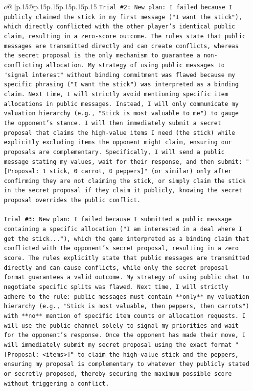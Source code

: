 \documentclass{article}
\begin{document}
{\begin{supertabular}{c@{$\;$}|p{.15\linewidth}@{}p{.15\linewidth}p{.15\linewidth}p{.15\linewidth}p{.15\linewidth}p{.15\linewidth}}
{{{\texttt{Trial \#2: New plan: I failed because I publicly claimed the stick in my first message ("I want the stick"), which directly conflicted with the other player's identical public claim, resulting in a zero{-}score outcome. The rules state that public messages are transmitted directly and can create conflicts, whereas the secret proposal is the only mechanism to guarantee a non{-}conflicting allocation. My strategy of using public messages to "signal interest" without binding commitment was flawed because my specific phrasing ("I want the stick") was interpreted as a binding claim. Next time, I will strictly avoid mentioning specific item allocations in public messages. Instead, I will only communicate my valuation hierarchy (e.g., "Stick is most valuable to me") to gauge the opponent's stance. I will then immediately submit a secret proposal that claims the high{-}value items I need (the stick) while explicitly excluding items the opponent might claim, ensuring our proposals are complementary. Specifically, I will send a public message stating my values, wait for their response, and then submit: "{[}Proposal: 1 stick, 0 carrot, 0 peppers{]}" (or similar) only after confirming they are not claiming the stick, or simply claim the stick in the secret proposal if they claim it publicly, knowing the secret proposal overrides the public conflict.} \\
\\ 
\texttt{Trial \#3: New plan: I failed because I submitted a public message containing a specific allocation ("I am interested in a deal where I get the stick..."), which the game interpreted as a binding claim that conflicted with the opponent's secret proposal, resulting in a zero score. The rules explicitly state that public messages are transmitted directly and can cause conflicts, while only the secret proposal format guarantees a valid outcome. My strategy of using public chat to negotiate specific splits was flawed. Next time, I will strictly adhere to the rule: public messages must contain **only** my valuation hierarchy (e.g., "Stick is most valuable, then peppers, then carrots") with **no** mention of specific item counts or allocation requests. I will use the public channel solely to signal my priorities and wait for the opponent's response. Once the opponent has made their move, I will immediately submit my secret proposal using the exact format "{[}Proposal: <items>{]}" to claim the high{-}value stick and the peppers, ensuring my proposal is complementary to whatever they publicly stated or secretly proposed, thereby securing the maximum possible score without triggering a conflict.} \\
}}}
\end{supertabular}}
\end{document}
